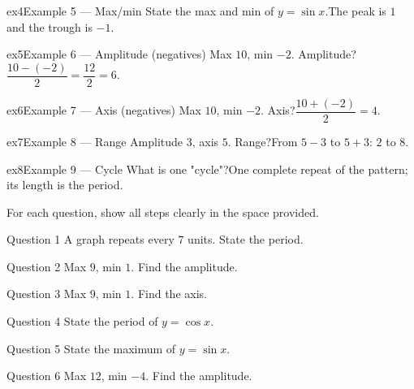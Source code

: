 \documentclass[11pt]{article}
\begin{document}
\begin{example}{ex4}{Example 5 --- Max/min}
State the max and min of $y=\sin x$.\soln The peak is $1$ and the trough is $-1$.
\end{example}

\begin{example}{ex5}{Example 6 --- Amplitude (negatives)}
Max $10$, min $-2$. Amplitude?\soln $\dfrac{10-(-2)}{2}=\dfrac{12}{2}=6$.
\end{example}

\begin{example}{ex6}{Example 7 --- Axis (negatives)}
Max $10$, min $-2$. Axis?\soln $\dfrac{10+(-2)}{2}=4$.
\end{example}

\begin{example}{ex7}{Example 8 --- Range}
Amplitude $3$, axis $5$. Range?\soln From $5-3$ to $5+3$: $2$ to $8$.
\end{example}

\begin{example}{ex8}{Example 9 --- Cycle}
What is one "cycle"?\soln One complete repeat of the pattern; its length is the period.
\end{example}

\clearpage
{}
For each question, show all steps clearly in the space provided.

\begin{qbox}{Question 1}
A graph repeats every $7$ units. State the period.\workspace{2.4cm}
\end{qbox}

\begin{qbox}{Question 2}
Max $9$, min $1$. Find the amplitude.\workspace{2.4cm}
\end{qbox}

\begin{qbox}{Question 3}
Max $9$, min $1$. Find the axis.\workspace{2.4cm}
\end{qbox}

\begin{qbox}{Question 4}
State the period of $y=\cos x$.\workspace{2.4cm}
\end{qbox}

\begin{qbox}{Question 5}
State the maximum of $y=\sin x$.\workspace{2.4cm}
\end{qbox}

\begin{qbox}{Question 6}
Max $12$, min $-4$. Find the amplitude.\workspace{2.4cm}
\end{qbox}
\end{document}
